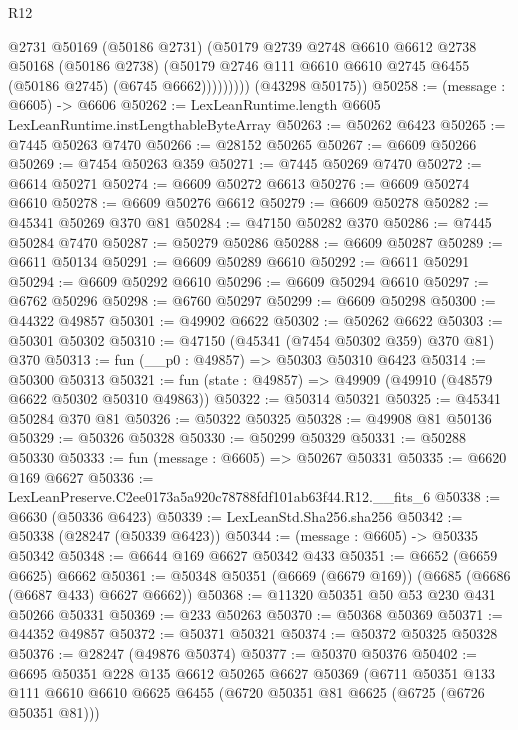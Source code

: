 \begin{lexlean}{R12}
\begin{coremodule}
                  @2731
                  @50169
                  (@50186 @2731)
                  (@50179
                    @2739
                    @2748
                    @6610
                    @6612
                    @2738
                    @50168
                    (@50186 @2738)
                    (@50179 @2746 @111 @6610 @6610 @2745 @6455 (@50186 @2745) (@6745 @6662)))))))))
      (@43298 @50175))
@50258 := (message : @6605) -> @6606
@50262 := LexLeanRuntime.length @6605 LexLeanRuntime.instLengthableByteArray
@50263 := @50262 @6423
@50265 := @7445 @50263 @7470
@50266 := @28152 @50265
@50267 := @6609 @50266
@50269 := @7454 @50263 @359
@50271 := @7445 @50269 @7470
@50272 := @6614 @50271
@50274 := @6609 @50272 @6613
@50276 := @6609 @50274 @6610
@50278 := @6609 @50276 @6612
@50279 := @6609 @50278
@50282 := @45341 @50269 @370 @81
@50284 := @47150 @50282 @370
@50286 := @7445 @50284 @7470
@50287 := @50279 @50286
@50288 := @6609 @50287
@50289 := @6611 @50134
@50291 := @6609 @50289 @6610
@50292 := @6611 @50291
@50294 := @6609 @50292 @6610
@50296 := @6609 @50294 @6610
@50297 := @6762 @50296
@50298 := @6760 @50297
@50299 := @6609 @50298
@50300 := @44322 @49857
@50301 := @49902 @6622
@50302 := @50262 @6622
@50303 := @50301 @50302
@50310 := @47150 (@45341 (@7454 @50302 @359) @370 @81) @370
@50313 := fun (__p0 : @49857) => @50303 @50310 @6423
@50314 := @50300 @50313
@50321 := fun (state : @49857) => @49909 (@49910 (@48579 @6622 @50302 @50310 @49863))
@50322 := @50314 @50321
@50325 := @45341 @50284 @370 @81
@50326 := @50322 @50325
@50328 := @49908 @81 @50136
@50329 := @50326 @50328
@50330 := @50299 @50329
@50331 := @50288 @50330
@50333 := fun (message : @6605) => @50267 @50331
@50335 := @6620 @169 @6627
@50336 := LexLeanPreserve.C2ee0173a5a920c78788fdf101ab63f44.R12.__fits_6
@50338 := @6630 (@50336 @6423)
@50339 := LexLeanStd.Sha256.sha256
@50342 := @50338 (@28247 (@50339 @6423))
@50344 := (message : @6605) -> @50335 @50342
@50348 := @6644 @169 @6627 @50342 @433
@50351 := @6652 (@6659 @6625) @6662
@50361 := @50348 @50351 (@6669 (@6679 @169)) (@6685 (@6686 (@6687 @433) @6627 @6662))
@50368 := @11320 @50351 @50 @53 @230 @431 @50266 @50331
@50369 := @233 @50263
@50370 := @50368 @50369
@50371 := @44352 @49857
@50372 := @50371 @50321
@50374 := @50372 @50325 @50328
@50376 := @28247 (@49876 @50374)
@50377 := @50370 @50376
@50402 := @6695
    @50351
    @228
    @135
    @6612
    @50265
    @6627
    @50369
    (@6711
      @50351
      @133
      @111
      @6610
      @6610
      @6625
      @6455
      (@6720 @50351 @81 @6625 (@6725 (@6726 @50351 @81)))

\end{coremodule}
\end{lexlean}
